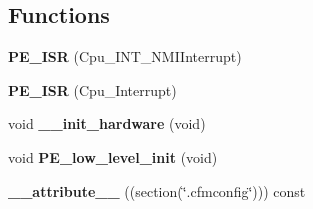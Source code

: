 \subsection*{Functions}
\begin{DoxyCompactItemize}
\item 
\hypertarget{group___cpu__module_ga89f6e345028fe4a0a105f4f95e1bb85c}{{\bfseries P\-E\-\_\-\-I\-S\-R} (Cpu\-\_\-\-I\-N\-T\-\_\-\-N\-M\-I\-Interrupt)}\label{group___cpu__module_ga89f6e345028fe4a0a105f4f95e1bb85c}

\item 
\hypertarget{group___cpu__module_gafa0067fa0d355a26ca9894983c01be6f}{{\bfseries P\-E\-\_\-\-I\-S\-R} (Cpu\-\_\-\-Interrupt)}\label{group___cpu__module_gafa0067fa0d355a26ca9894983c01be6f}

\item 
\hypertarget{group___cpu__module_ga32a8d86789a3326b3120bf1e1c1d4252}{void {\bfseries \-\_\-\-\_\-init\-\_\-hardware} (void)}\label{group___cpu__module_ga32a8d86789a3326b3120bf1e1c1d4252}

\item 
\hypertarget{group___cpu__module_ga95039f54c45f24c1b4ed640fa2f63f11}{void {\bfseries P\-E\-\_\-low\-\_\-level\-\_\-init} (void)}\label{group___cpu__module_ga95039f54c45f24c1b4ed640fa2f63f11}

\item 
\hypertarget{group___cpu__module_ga2d9b5b981f451cdf47bf43b4f9cc9e03}{{\bfseries \-\_\-\-\_\-attribute\-\_\-\-\_\-} ((section(\char`\"{}.cfmconfig\char`\"{}))) const}\label{group___cpu__module_ga2d9b5b981f451cdf47bf43b4f9cc9e03}

\end{DoxyCompactItemize}
